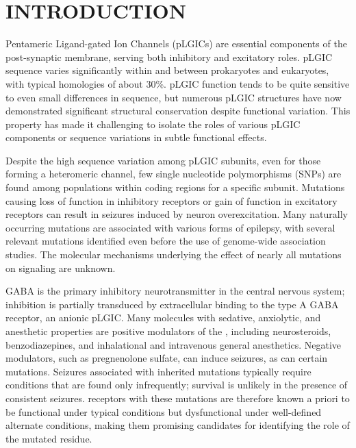 \documentclass[12pt,onecolumn]{biophys}
\begin{document}
\section*{INTRODUCTION}
\newcommand{\WT}{WT\xspace}
\newcommand{\MT}{K289M\xspace}
\newcommand{\RMSD}{RMSD\textsubscript{symm}\xspace}
\newcommand{\WTs}{WT systems\xspace}
\newcommand{\MTs}{K289M systems\xspace}
\newcommand{\RMSDs}{RMSDs\textsubscript{symm}\xspace}

  Pentameric Ligand-gated Ion Channels (pLGICs) are essential components of the post-synaptic membrane, serving both inhibitory and excitatory roles.  pLGIC sequence varies significantly within and between prokaryotes and eukaryotes,\cite{Jaiteh2016} with typical homologies of about 30\%.  pLGIC function tends to be quite sensitive to even small differences in sequence, but numerous pLGIC structures have now demonstrated significant structural conservation despite functional variation.  This property has made it challenging to isolate the roles of various pLGIC components or sequence variations in subtle functional effects.  
    
  Despite the high sequence variation among pLGIC subunits, even for those forming a heteromeric channel, few single nucleotide polymorphisms (SNPs) are found among populations within coding regions for a specific subunit.   Mutations causing loss of function in inhibitory receptors or gain of function in excitatory receptors can result in seizures induced by neuron overexcitation. Many naturally occurring mutations are associated with various forms of epilepsy\cite{Bianchi2002,Cossette2002,Kang2004,Macdonald2004}, with several relevant mutations identified even before the use of genome-wide association studies. The molecular mechanisms underlying the effect of nearly all mutations on signaling are unknown.

GABA is the primary inhibitory neurotransmitter in the central nervous system; inhibition is partially transduced by extracellular binding to the type A GABA receptor, an anionic pLGIC\cite{Olsen1990,Macdonald1994,Rabow1995}. Many molecules with sedative, anxiolytic, and anesthetic properties are positive modulators of the \GABAA, including neurosteroids\cite {Mihic1997,Belelli2005a, Mitchell2008,Lambert2009,Olsen2011a}, benzodiazepines\cite{Sigel1997}, and inhalational and intravenous general anesthetics\cite {Krasowski1999,Harris1995,Miller2002}. Negative modulators, such as pregnenolone sulfate\cite{Majewska1988}, can induce seizures, as can certain mutations. Seizures associated with inherited mutations typically require conditions that are found only infrequently; survival is unlikely in the presence of consistent seizures.  \GABAA receptors with these mutations are therefore known a priori to be functional under typical conditions but dysfunctional under well-defined alternate conditions, making them promising candidates for identifying the role of the mutated residue.   
\end{document}
